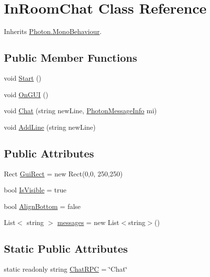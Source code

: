 \hypertarget{class_in_room_chat}{}\section{In\+Room\+Chat Class Reference}
\label{class_in_room_chat}


Inherits \hyperlink{class_photon_1_1_mono_behaviour}{Photon.\+Mono\+Behaviour}.

\subsection*{Public Member Functions}
\begin{DoxyCompactItemize}
\item 
void \hyperlink{class_in_room_chat_a6b783c7f6c334ee0b0c1384f83928fab}{Start} ()
\item 
void \hyperlink{class_in_room_chat_af9fe56fdb21db3868eda31175fe5512c}{On\+G\+UI} ()
\item 
void \hyperlink{class_in_room_chat_a4d96349205f511958033febb9f30461f}{Chat} (string new\+Line, \hyperlink{class_photon_message_info}{Photon\+Message\+Info} mi)
\item 
void \hyperlink{class_in_room_chat_ad942cd6f67bcf966adcf976fbd3055bd}{Add\+Line} (string new\+Line)
\end{DoxyCompactItemize}
\subsection*{Public Attributes}
\begin{DoxyCompactItemize}
\item 
Rect \hyperlink{class_in_room_chat_acc85d6ed055432d0cff5a93f8de88a39}{Gui\+Rect} = new Rect(0,0, 250,250)
\item 
bool \hyperlink{class_in_room_chat_adbfef915a36e98692020697a6cacfca6}{Is\+Visible} = true
\item 
bool \hyperlink{class_in_room_chat_a83f0c6044fed77a2950457f30ac2607c}{Align\+Bottom} = false
\item 
List$<$ string $>$ \hyperlink{class_in_room_chat_aaf95335cf66ac85905d13191dd5da780}{messages} = new List$<$string$>$()
\end{DoxyCompactItemize}
\subsection*{Static Public Attributes}
\begin{DoxyCompactItemize}
\item 
static readonly string \hyperlink{class_in_room_chat_aa0b4576ed000e07dc1dc587afcf0f21c}{Chat\+R\+PC} = \char`\"{}Chat\char`\"{}
\end{DoxyCompactItemize}

